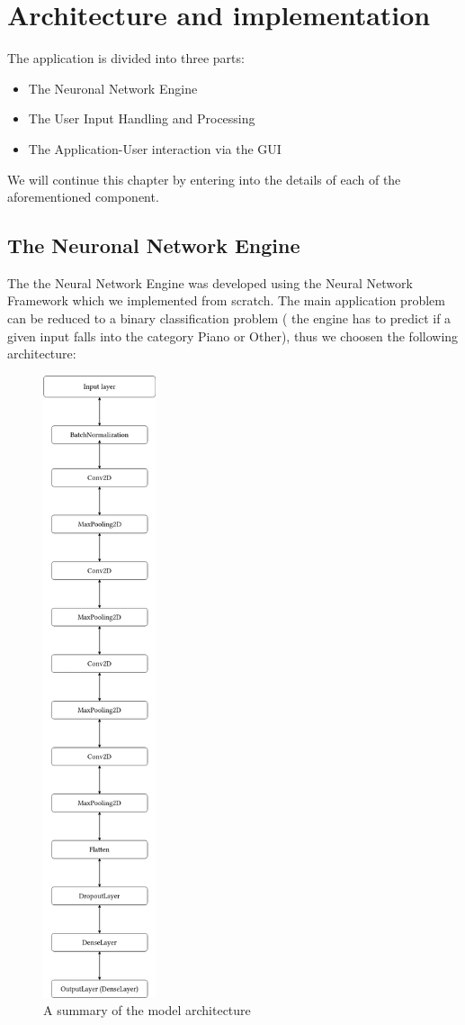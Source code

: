 \chapter{Architecture and implementation}

The application is divided into three parts:
	\begin{itemize}
		\addtolength{\itemindent}{1cm}
		\item The Neuronal Network Engine
		\item The User Input Handling and Processing
		\item The Application-User interaction via the GUI
	\end{itemize}

We will continue this chapter by entering into the details of each of the aforementioned component.

\section{The Neuronal Network Engine}

The the Neural Network Engine was developed using the Neural Network Framework which we implemented from scratch.
The main application problem can be reduced to a binary classification problem ( the engine has to predict if a given
input falls into the category Piano or Other), thus we choosen the following architecture:


\begin{figure}[H]
	\centering
	\includegraphics[width = 1.3in]{images/summary.png}
	\caption{A summary of the model architecture}
\label{model_arch}
\end{figure}

